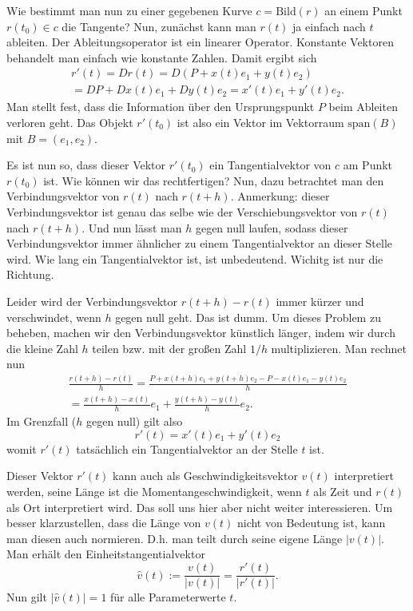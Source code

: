 \documentclass[a4paper,12pt,fleqn]{article}
\begin{document}
Wie bestimmt man nun zu einer gegebenen Kurve \(c=\mathrm{Bild}(r)\)
an einem Punkt \(r(t_0)\in c\) die Tangente? Nun, zunächst kann man
\(r(t)\) ja einfach nach \(t\) ableiten. Der Ableitungsoperator
ist ein linearer Operator. Konstante Vektoren behandelt man einfach
wie konstante Zahlen. Damit ergibt sich
\begin{gather*}
r'(t) = Dr(t) = D(P+x(t)e_1+y(t)e_2)\\
= DP+Dx(t)e_1+Dy(t)e_2 = x'(t)e_1+y'(t)e_2.
\end{gather*}
Man stellt fest, dass die Information über den Ursprungspunkt \(P\)
beim Ableiten verloren geht. Das Objekt \(r'(t_0)\) ist also ein
Vektor im Vektorraum \(\mathrm{span}(B)\) mit \(B=(e_1,e_2)\).

Es ist nun so, dass dieser Vektor \(r'(t_0)\) ein Tangentialvektor
von \(c\) am Punkt \(r(t_0)\) ist. Wie können wir das rechtfertigen?
Nun, dazu betrachtet man den Verbindungsvektor von \(r(t)\) nach
\(r(t+h)\). Anmerkung: dieser Verbindungsvektor ist genau das selbe
wie der Verschiebungsvektor von \(r(t)\) nach \(r(t+h)\).
Und nun lässt man \(h\) gegen null laufen, sodass dieser
Verbindungsvektor immer ähnlicher zu einem Tangentialvektor an dieser
Stelle wird. Wie lang ein Tangentialvektor ist, ist unbedeutend.
Wichitg ist nur die Richtung.

Leider wird der Verbindungsvektor \(r(t+h)-r(t)\) immer kürzer
und verschwindet, wenn \(h\) gegen null geht. Das ist dumm. Um dieses
Problem zu beheben, machen wir den Verbindungsvektor künstlich länger,
indem wir durch die kleine Zahl \(h\) teilen bzw. mit der großen
Zahl \(1/h\) multiplizieren. Man rechnet nun
\begin{gather*}
\frac{r(t+h)-r(t)}{h}
= \frac{P+x(t+h)e_1+y(t+h)e_2-P-x(t)e_1-y(t)e_2}{h}\\
= \frac{x(t+h)-x(t)}{h}e_1 + \frac{y(t+h)-y(t)}{h}e_2.
\end{gather*}
Im Grenzfall (\(h\) gegen null) gilt also
\[r'(t) = x'(t)e_1+y'(t)e_2\]
womit \(r'(t)\) tatsächlich ein Tangentialvektor an der Stelle \(t\)
ist.

Dieser Vektor \(r'(t)\) kann auch als Geschwindigkeitsvektor \(v(t)\)
interpretiert werden, seine Länge ist die Momentangeschwindigkeit,
wenn \(t\) als Zeit und \(r(t)\) als Ort interpretiert wird.
Das soll uns hier aber nicht weiter interessieren.
Um besser klarzustellen, dass die Länge von \(v(t)\)
nicht von Bedeutung ist, kann man diesen auch normieren.
D.h. man teilt durch seine eigene Länge \(|v(t)|\).
Man erhält den Einheitstangentialvektor
\begin{equation}
\hat v(t) := \frac{v(t)}{|v(t)|} = \frac{r'(t)}{|r'(t)|}.
\end{equation}
Nun gilt \(|\hat v(t)|=1\) für alle Parameterwerte \(t\).
\end{document}

